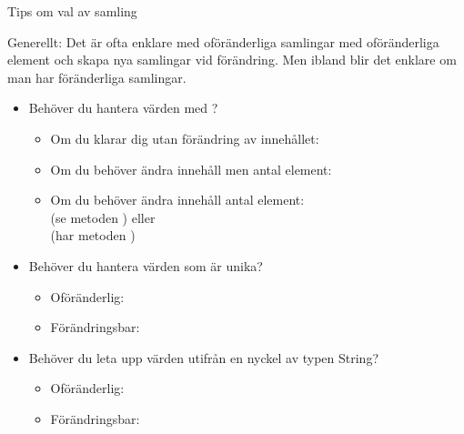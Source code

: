 \begin{Slide}{Tips om val av samling}\SlideFontSmall

Generellt: Det är ofta enklare med oföränderliga samlingar med oföränderliga element och skapa nya samlingar vid förändring. Men ibland blir det enklare om man har föränderliga samlingar.

\begin{itemize}
\item Behöver du hantera värden  med ?
\begin{itemize}\SlideFontTiny
\item Om du klarar dig utan förändring av innehållet:\\ 
\item Om du behöver ändra innehåll men  antal element: \\  
\item Om du behöver ändra innehåll  antal element: 
\\  (se metoden ) eller \\  (har metoden )
\end{itemize}

\item Behöver du hantera värden  som är unika?
\begin{itemize}\SlideFontTiny
\item Oföränderlig: 
\item Förändringsbar: 
\end{itemize}

\item Behöver du leta upp värden  utifrån en nyckel av typen String?
\begin{itemize}\SlideFontTiny
\item Oföränderlig: 
\item Förändringsbar: 
\end{itemize}


\end{itemize}
\end{Slide}

